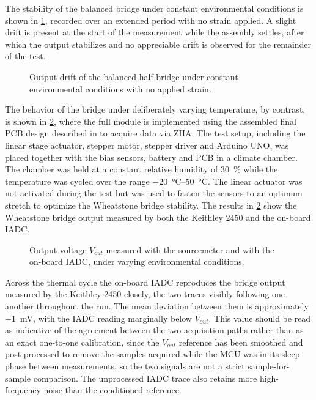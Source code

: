 The stability of the balanced bridge under constant environmental conditions is shown in \cref{fig:Wheatstone_drift}, recorded over an extended period with no strain applied. A slight drift is present at the start of the measurement while the assembly settles, after which the output stabilizes and no appreciable drift is observed for the remainder of the test.

\begin{figure}[!b]
\centering

    \caption{Output drift of the balanced half-bridge under constant environmental conditions with no applied strain.}
    \label{fig:Wheatstone_drift}
\end{figure}

The behavior of the bridge under deliberately varying temperature, by contrast, is shown in \cref{fig:FS_ADCogVout}, where the full module is implemented using the assembled final PCB design described in  to acquire data via ZHA. The test setup, including the linear stage actuator, stepper motor, stepper driver and Arduino UNO, was placed together with the bias sensors, battery and PCB in a climate chamber. The chamber was held at a constant relative humidity of \SI{30}{\percent} while the temperature was cycled over the range \SIrange{-20}{50}{\celsius}. The linear actuator was not activated during the test but was used to fasten the sensors to an optimum stretch to optimize the Wheatstone bridge stability. The results in \cref{fig:FS_ADCogVout} show the Wheatstone bridge output measured by both the Keithley 2450 and the on-board IADC.

\begin{figure}
\centering

    \caption{Output voltage \(V_{out}\) measured with the sourcemeter and with the on-board IADC, under varying environmental conditions.}
    \label{fig:FS_ADCogVout}
\end{figure}

Across the thermal cycle the on-board IADC reproduces the bridge output measured by the Keithley 2450 closely, the two traces visibly following one another throughout the run. The mean deviation between them is approximately \SI{-1}{\milli\volt}, with the IADC reading marginally below \(V_{out}\). This value should be read as indicative of the agreement between the two acquisition paths rather than as an exact one-to-one calibration, since the \(V_{out}\) reference has been smoothed and post-processed to remove the samples acquired while the MCU was in its sleep phase between measurements, so the two signals are not a strict sample-for-sample comparison. The unprocessed IADC trace also retains more high-frequency noise than the conditioned reference.

